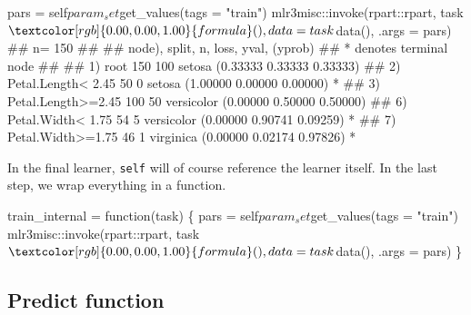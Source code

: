 \documentclass[
  11pt,
  parskip=half,
  DIV=calc,
  BCOR=10mm,
  x11names]{scrbook}
\newenvironment{Shaded}{}{}
\newcommand{\ControlFlowTok}[1]{\textcolor[rgb]{0.00,0.00,1.00}{#1}}
\newcommand{\DataTypeTok}[1]{#1}
\newcommand{\KeywordTok}[1]{\textcolor[rgb]{0.00,0.00,1.00}{#1}}
\newcommand{\NormalTok}[1]{#1}
\newcommand{\OperatorTok}[1]{#1}
\newcommand{\StringTok}[1]{\textcolor[rgb]{0.00,0.50,0.50}{#1}}
\begin{document}
\begin{Shaded}
\begin{Highlighting}[]
\NormalTok{pars =}\StringTok{ }\NormalTok{self}\OperatorTok{$}\NormalTok{param_set}\OperatorTok{$}\KeywordTok{get_values}\NormalTok{(}\DataTypeTok{tags =} \StringTok{"train"}\NormalTok{)}
\NormalTok{mlr3misc}\OperatorTok{::}\KeywordTok{invoke}\NormalTok{(rpart}\OperatorTok{::}\NormalTok{rpart, task}\OperatorTok{$}\KeywordTok{formula}\NormalTok{(), }\DataTypeTok{data =}\NormalTok{ task}\OperatorTok{$}\KeywordTok{data}\NormalTok{(), }
  \DataTypeTok{.args =}\NormalTok{ pars)}
\NormalTok{## n= 150 }
\NormalTok{## }
\NormalTok{## node), split, n, loss, yval, (yprob)}
\NormalTok{##       * denotes terminal node}
\NormalTok{## }
\NormalTok{## 1) root 150 100 setosa (0.33333 0.33333 0.33333)  }
\NormalTok{##   2) Petal.Length< 2.45 50   0 setosa (1.00000 0.00000 0.00000) *}
\NormalTok{##   3) Petal.Length>=2.45 100  50 versicolor (0.00000 0.50000 0.50000)  }
\NormalTok{##     6) Petal.Width< 1.75 54   5 versicolor (0.00000 0.90741 0.09259) *}
\NormalTok{##     7) Petal.Width>=1.75 46   1 virginica (0.00000 0.02174 0.97826) *}
\end{Highlighting}
\end{Shaded}

In the final learner, \texttt{self} will of course reference the learner itself.
In the last step, we wrap everything in a function.

\begin{Shaded}
\begin{Highlighting}[]
\NormalTok{train_internal =}\StringTok{ }\ControlFlowTok{function}\NormalTok{(task) \{}
\NormalTok{  pars =}\StringTok{ }\NormalTok{self}\OperatorTok{$}\NormalTok{param_set}\OperatorTok{$}\KeywordTok{get_values}\NormalTok{(}\DataTypeTok{tags =} \StringTok{"train"}\NormalTok{)}
\NormalTok{  mlr3misc}\OperatorTok{::}\KeywordTok{invoke}\NormalTok{(rpart}\OperatorTok{::}\NormalTok{rpart, task}\OperatorTok{$}\KeywordTok{formula}\NormalTok{(), }\DataTypeTok{data =}\NormalTok{ task}\OperatorTok{$}\KeywordTok{data}\NormalTok{(), }
    \DataTypeTok{.args =}\NormalTok{ pars)}
\NormalTok{\}}
\end{Highlighting}
\end{Shaded}

\hypertarget{learner-predict}{%
\subsection{Predict function}\label{learner-predict}}
\end{document}
